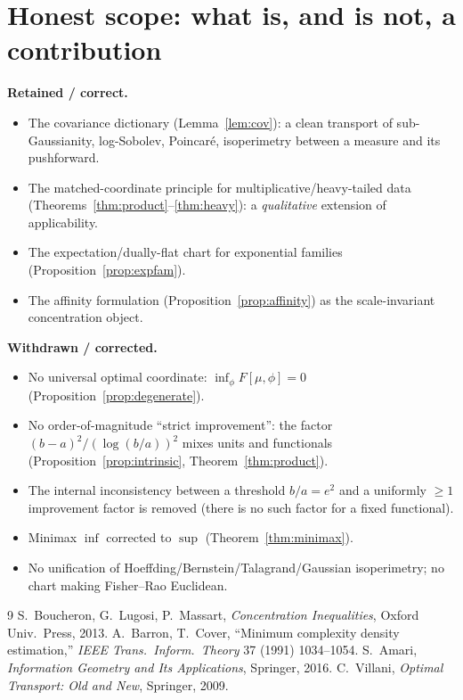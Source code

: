 \documentclass[11pt]{article}
\theoremstyle{plain}
\theoremstyle{definition}
\theoremstyle{remark}
\begin{document}
\section{Honest scope: what is, and is not, a contribution}
\label{sec:scope}

\noindent\textbf{Retained / correct.}
\begin{itemize}[leftmargin=1.4em]
\item The covariance dictionary (Lemma~\ref{lem:cov}): a clean transport of
sub-Gaussianity, log-Sobolev, Poincar\'e, isoperimetry between a measure and its
pushforward.
\item The matched-coordinate principle for multiplicative/heavy-tailed data
(Theorems~\ref{thm:product}--\ref{thm:heavy}): a \emph{qualitative} extension of
applicability.
\item The expectation/dually-flat chart for exponential families
(Proposition~\ref{prop:expfam}).
\item The affinity formulation (Proposition~\ref{prop:affinity}) as the
scale-invariant concentration object.
\end{itemize}

\noindent\textbf{Withdrawn / corrected.}
\begin{itemize}[leftmargin=1.4em]
\item No universal optimal coordinate: $\inf_\phi F[\mu,\phi]=0$
(Proposition~\ref{prop:degenerate}).
\item No order-of-magnitude ``strict improvement'': the factor
$(b-a)^2/(\log(b/a))^2$ mixes units and functionals
(Proposition~\ref{prop:intrinsic}, Theorem~\ref{thm:product}).
\item The internal inconsistency between a threshold $b/a=e^2$ and a uniformly
$\ge1$ improvement factor is removed (there is no such factor for a fixed
functional).
\item Minimax $\inf$ corrected to $\sup$ (Theorem~\ref{thm:minimax}).
\item No unification of Hoeffding/Bernstein/Talagrand/Gaussian isoperimetry; no
chart making Fisher--Rao Euclidean.
\end{itemize}

\begin{thebibliography}{9}
 S.~Boucheron, G.~Lugosi, P.~Massart, \emph{Concentration
Inequalities}, Oxford Univ.\ Press, 2013.
 A.~Barron, T.~Cover, ``Minimum complexity density
estimation,'' \emph{IEEE Trans.\ Inform.\ Theory} 37 (1991) 1034--1054.
 S.~Amari, \emph{Information Geometry and Its Applications},
Springer, 2016.
 C.~Villani, \emph{Optimal Transport: Old and New}, Springer,
2009.
\end{thebibliography}
\end{document}
